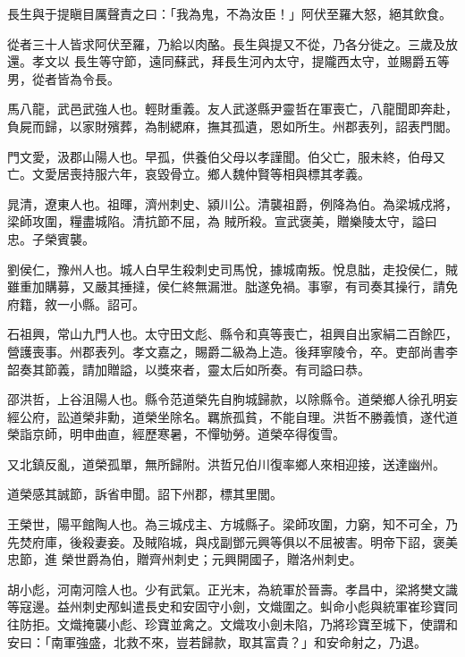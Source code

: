 \begin{pinyinscope}
 長生與于提瞋目厲聲責之曰：「我為鬼，不為汝臣！」阿伏至羅大怒，絕其飲食。



 從者三十人皆求阿伏至羅，乃給以肉酪。長生與提又不從，乃各分徙之。三歲及放還。孝文以
 長生等守節，遠同蘇武，拜長生河內太守，提隴西太守，並賜爵五等男，從者皆為令長。



 馬八龍，武邑武強人也。輕財重義。友人武遂縣尹靈哲在軍喪亡，八龍聞即奔赴，負屍而歸，以家財殯葬，為制緦麻，撫其孤遺，恩如所生。州郡表列，詔表門閭。



 門文愛，汲郡山陽人也。早孤，供養伯父母以孝謹聞。伯父亡，服未終，伯母又亡。文愛居喪持服六年，哀毀骨立。鄉人魏仲賢等相與標其孝義。



 晁清，遼東人也。祖暉，濟州刺史、潁川公。清襲祖爵，例降為伯。為梁城戍將，梁師攻圍，糧盡城陷。清抗節不屈，為
 賊所殺。宣武褒美，贈樂陵太守，謚曰忠。子榮賓襲。



 劉侯仁，豫州人也。城人白早生殺刺史司馬悅，據城南叛。悅息朏，走投侯仁，賊雖重加購募，又嚴其捶撻，侯仁終無漏泄。朏遂免禍。事寧，有司奏其操行，請免府籍，敘一小縣。詔可。



 石祖興，常山九門人也。太守田文彪、縣令和真等喪亡，祖興自出家絹二百餘匹，營護喪事。州郡表列。孝文嘉之，賜爵二級為上造。後拜寧陵令，卒。吏部尚書李韶奏其節義，請加贈謚，以獎來者，靈太后如所奏。有司謚曰恭。



 邵洪哲，上谷沮陽人也。縣令范道榮先自朐城歸款，以除縣令。道榮鄉人徐孔明妄經公府，訟道榮非勳，道榮坐除名。羈旅孤貧，不能自理。洪哲不勝義憤，遂代道榮詣京師，明申曲直，經歷寒暑，不憚劬勞。道榮卒得復雪。



 又北鎮反亂，道榮孤單，無所歸附。洪哲兄伯川復率鄉人來相迎接，送達幽州。



 道榮感其誠節，訴省申聞。詔下州郡，標其里閭。



 王榮世，陽平館陶人也。為三城戍主、方城縣子。梁師攻圍，力窮，知不可全，乃先焚府庫，後殺妻妾。及賊陷城，與戍副鄧元興等俱以不屈被害。明帝下詔，褒美忠節，進
 榮世爵為伯，贈齊州刺史；元興開國子，贈洛州刺史。



 胡小彪，河南河陰人也。少有武氣。正光末，為統軍於晉壽。孝昌中，梁將樊文識等寇邊。益州刺史邴虯遣長史和安固守小劍，文熾圍之。虯命小彪與統軍崔珍寶同往防拒。文熾掩襲小彪、珍寶並禽之。文熾攻小劍未陷，乃將珍寶至城下，使謂和安曰：「南軍強盛，北救不來，豈若歸款，取其富貴？」和安命射之，乃退。




\end{pinyinscope}

